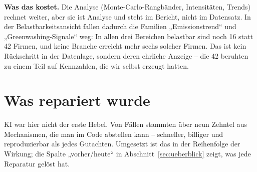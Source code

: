 \documentclass[11pt,a4paper]{article}
\begin{document}
\textbf{Was das kostet.} Die Analyse (Monte-Carlo-Rangbänder, Intensitäten, Trends) rechnet weiter, aber sie ist Analyse und steht im Bericht, nicht im Datensatz. In der Belastbarkeitsansicht fallen dadurch die Familien „Emissionstrend“ und „Greenwashing-Signale“ weg: In allen drei Bereichen belastbar sind noch 16 statt 42 Firmen, und keine Branche erreicht mehr sechs solcher Firmen. Das ist kein Rückschritt in der Datenlage, sondern deren ehrliche Anzeige -- die 42 beruhten zu einem Teil auf Kennzahlen, die wir selbst erzeugt hatten.

\section{Was repariert wurde}
\label{sec:reparatur}

KI war hier nicht der erste Hebel. Von \vorFlags{} Fällen stammten über neun Zehntel aus Mechanismen, die man im Code abstellen kann -- schneller, billiger und reproduzierbar als jedes Gutachten. Umgesetzt ist das in der Reihenfolge der Wirkung; die Spalte „vorher/heute“ in Abschnitt~\ref{sec:ueberblick} zeigt, was jede Reparatur gelöst hat.
\end{document}
